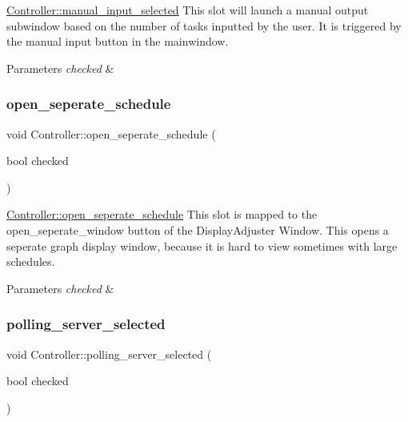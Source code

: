 \hyperlink{classController_a2daeb91e3a6c79ddfa46fd04770012ff}{Controller\+::manual\+\_\+input\+\_\+selected} This slot will launch a manual output subwindow based on the number of tasks inputted by the user. It is triggered by the manual input button in the mainwindow. 


\begin{DoxyParams}{Parameters}
{\em checked} & \\
\hline
\end{DoxyParams}
\mbox{\label{classController_aeec075efe687085d150d1e47504485c2}} 
\subsubsection{\texorpdfstring{open\+\_\+seperate\+\_\+schedule}{open\_seperate\_schedule}}
{\footnotesize\ttfamily void Controller\+::open\+\_\+seperate\+\_\+schedule (\begin{DoxyParamCaption}\item[{bool}]{checked }\end{DoxyParamCaption})\hspace{0.3cm}{\ttfamily [slot]}}



\hyperlink{classController_aeec075efe687085d150d1e47504485c2}{Controller\+::open\+\_\+seperate\+\_\+schedule} This slot is mapped to the open\+\_\+seperate\+\_\+window button of the Display\+Adjuster Window. This opens a seperate graph display window, because it is hard to view sometimes with large schedules. 


\begin{DoxyParams}{Parameters}
{\em checked} & \\
\hline
\end{DoxyParams}
\mbox{\label{classController_aeca721bb54b3495d2a490d6f658799a5}} 
\subsubsection{\texorpdfstring{polling\+\_\+server\+\_\+selected}{polling\_server\_selected}}
{\footnotesize\ttfamily void Controller\+::polling\+\_\+server\+\_\+selected (\begin{DoxyParamCaption}\item[{bool}]{checked }\end{DoxyParamCaption})\hspace{0.3cm}{\ttfamily [slot]}}



